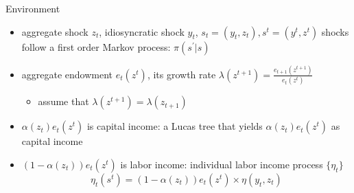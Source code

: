 \documentclass[9pt]{beamer}
\theoremstyle{mystyle}
\begin{document}
\begin{frame}{Environment}
\begin{itemize}%
\item aggregate shock $z_t$, idiosyncratic shock $y_t$, $s_t = (y_t,z_t),  s^t = (y^t,z^t)$ shocks follow a first order Markov process: $\pi(s^\prime|s)$
\vspace{5mm}
\item aggregate endowment $e_t(z^t)$, its growth rate $\lambda(z^{t+1}) = \frac{e_{t+1}(z^{t+1})}{e_{t}(z^{t})}$
\vspace{5mm}
\begin{itemize}
\item assume that $\lambda(z^{t+1}) = \lambda(z_{t+1})$
\end{itemize}
\vspace{5mm}
\item $\alpha(z_t)e_t(z^t)$ is capital income: a Lucas tree that yields $\alpha(z_t)e_t(z^t)$ as capital income 
\vspace{5mm}
\item $(1-\alpha(z_t))e_t(z^t)$ is labor income: individual labor income process $\{\eta_t\}$
\begin{equation*}
\eta_t(s^t) = (1-\alpha(z_t))e_t(z^t) \times \eta(y_t, z_t)
\end{equation*}
\end{itemize}
\end{frame}

\end{document}

